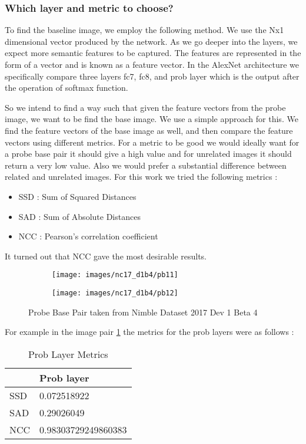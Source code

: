 \documentclass{article}
\begin{document}
\subsubsection{Which layer and metric to choose?}
To find the baseline image, we employ the following method. We use the Nx1 dimensional vector produced by the network. As we go deeper into the layers, we expect more semantic features to be captured. The features are represented in the form of a vector and is known as a feature vector. In the AlexNet architecture we specifically compare three layers fc7, fc8, and prob layer which is the output after the operation of softmax function.

So we intend to find a way such that given the feature vectors from the probe image, we want to be find the base image. We use a simple approach for this. We find the feature vectors of the base image as well, and then compare the feature vectors using different metrics. For a metric to be good we would ideally want for a probe base pair it should give a high value and for unrelated images it should return a very low value. Also we would prefer a substantial difference between related and unrelated images. For this work we tried the following metrics :
\begin{itemize}
\item SSD : Sum of Squared Distances
\item SAD : Sum of Absolute Distances
\item NCC : Pearson's correlation coefficient
\end{itemize}

It turned out that NCC gave the most desirable results.
\begin{figure}[H]
  \centering
  \begin{subfigure}[t]{0.45\textwidth}
    \centering
    \texttt{[image: images/nc17\_d1b4/pb11]}
  \end{subfigure}
  \begin{subfigure}[t]{0.45\textwidth}
    \centering
    \texttt{[image: images/nc17\_d1b4/pb12]}
  \end{subfigure}
  \caption{Probe Base Pair taken from Nimble Dataset 2017 Dev 1 Beta 4}
  \label{fig:ncc_res}
\end{figure}

For example in the image pair \ref{fig:ncc_res} the metrics for the prob layers were as follows :

\begin{table}[H]
\centering
\caption{Prob Layer Metrics}
\label{pb_metrics}
\begin{tabular}{|l|l|}
  \hline
  & Prob layer          \\
  \hline
  SSD & 0.072518922         \\
  SAD & 0.29026049          \\
  NCC & 0.98303729249860383 \\
  \hline
\end{tabular}
\end{table}
\end{document}
